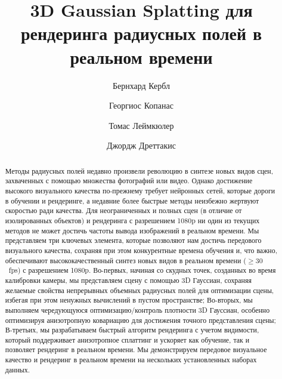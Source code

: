 \documentclass[acmtog]{acmart}
\begin{document}
\title{3D Gaussian Splatting для рендеринга радиусных полей в реальном времени}


\author{Бернхард Кербл}
\author{Георгиос Копанас}
\authornotemark[1]
\author{Томас Леймкюлер}
\author{Джордж Дреттакис}

\def\Dg{DG}



\newcommand{\ADDITION}[1]{#1}
\newcommand{\REMOVAL}[1]{}
\newcommand{\CORRECTION}[2]{#2}


\begin{abstract}
Методы радиусных полей недавно произвели революцию в синтезе новых видов сцен, захваченных с помощью множества фотографий или видео. Однако достижение высокого визуального качества по-прежнему требует нейронных сетей, которые дороги в обучении и рендеринге, а недавние более быстрые методы неизбежно жертвуют скоростью ради качества. Для неограниченных и полных сцен (в отличие от изолированных объектов) и рендеринга с разрешением 1080p ни один из текущих методов не может достичь частоты вывода изображений в реальном времени. Мы представляем три ключевых элемента, которые позволяют нам достичь передового визуального качества, сохраняя при этом конкурентные времена обучения и, что важно, обеспечивают высококачественный синтез новых видов в реальном времени ($\geq30$~fps) с разрешением 1080p. Во-первых, начиная со скудных точек, созданных во время калибровки камеры, мы представляем сцену с помощью 3D Гауссиан, сохраняя желаемые свойства непрерывных объемных радиусных полей для оптимизации сцены, избегая при этом ненужных вычислений в пустом пространстве; Во-вторых, мы выполняем чередующуюся оптимизацию/контроль плотности 3D Гауссиан, особенно оптимизируя анизотропную ковариацию для достижения точного представления сцены; В-третьих, мы разрабатываем быстрый алгоритм рендеринга с учетом видимости, который поддерживает анизотропное сплаттинг и ускоряет как обучение, так и позволяет рендеринг в реальном времени. Мы демонстрируем передовое визуальное качество и рендеринг в реальном времени на нескольких установленных наборах данных.
\end{abstract}
\end{document}
